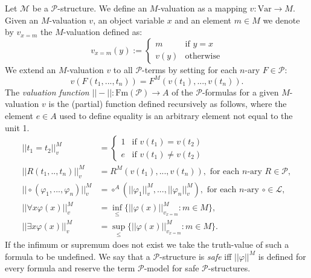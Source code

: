 \documentclass{lmcs} %
\newcommand{\?}{\ensuremath{\mkern0.4\thinmuskip}}
\let\phi=\varphi
\newcommand{\CM}{\mathcal{M}}
\newcommand{\CL}{\mathcal{L}}
\newcommand{\CP}{\mathcal{P}}
\begin{document}
\begin{defi}\label{def:valuation}
    Let $\CM$ be a $\CP$-structure. We define an $M$-valuation as a mapping $v\colon \mathrm{Var}\rightarrow M$. Given an $M$-valuation $v$, an object variable $x$ and an element $m\in M$ we denote by $v_{x=m}$ the $M$-valuation defined as:\[v_{x=m}(y):=\begin{cases}
        m & \text{if }y=x\\
        v(y) & \text{otherwise}
    \end{cases}\]
    We extend an $M$-valuation $v$ to all $\CP$-terms by setting for each $n$-ary $F\in\CP$: \[v(F(t_1,...,t_n))=F^M(v(t_1),...,v(t_n)).\]
    The \textit{valuation function} $||-||\colon \mathrm{Fm}(\CP)\rightarrow A$ of the $\CP$-formulas for a given $M$-valuation $v$ is the (partial) function defined recursively as follows, where the element $e\in A$ used to define equality is an arbitrary element not equal to the unit 1.\begin{align*}
        ||t_1=t_2||^M_v&=
        \begin{cases}
            1 &\text{if } v(t_1)=v(t_2)\\
            e &\text{if } v(t_1)\not=v(t_2)
        \end{cases}\\
        ||R(t_1,..,t_n)||^M_v &=
        R^M(v(t_1),...,v(t_n)),\text{ for each }n\text{-ary }R\in \CP,\\
        ||\circ(\phi_1,...,\phi_n)||^M_v &=\circ^A(||\phi_1||^M_v,...,||\phi_n||^M_v),\text{ for each }n\text{-ary }\circ\in\CL,\\
        ||\forall x\phi(x)||^M_v &=\inf_{\leq}\{||\phi(x)||^M_{v_{x=m}}:m\in M\},\\
        ||\exists x\phi(x)||^M_v &=\sup_{\leq}\{||\phi(x)||^M_{v_{x=m}}:m\in M\}.
    \end{align*} 
    If the infimum or supremum does not exist we take the truth-value of such a formula to be undefined. We say that a $\CP$-structure is \textit{safe} iff $||\phi||^M$ is defined for every formula and reserve the term $\CP$-model for safe $\CP$-structures. 
\end{defi}
\end{document}
